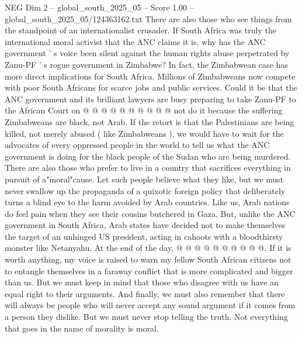 \begin{textsample}{NEG Dim 2 – global\_south\_2025\_05 – Score 1.00 – global\_south\_2025\_05/124363162.txt}
There are also those who see things from the standpoint of an internationalist crusader.
If South Africa was truly the international moral activist that the ANC claims it is, why has the ANC government ' s voice been silent against the human rights abuse perpetrated by Zanu-PF ' s rogue government in Zimbabwe?
In fact, the Zimbabwean case has more direct implications for South Africa.
Millions of Zimbabweans now compete with poor South Africans for scarce jobs and public services.
Could it be that the ANC government and its brilliant lawyers are busy preparing to take Zanu-PF to the African Court on @ @ @ @ @ @ @ @ @ @ not do it because the suffering Zimbabweans are black, not Arab.
If the retort is that the Palestinians are being killed, not merely abused ( like Zimbabweans ), we would have to wait for the advocates of every oppressed people in the world to tell us what the ANC government is doing for the black people of the Sudan who are being murdered.
There are also those who prefer to live in a country that sacrifices everything in pursuit of a"moral"cause.
Let such people believe what they like, but we must never swallow up the propaganda of a quixotic foreign policy that deliberately turns a blind eye to the harm avoided by Arab countries.
Like us, Arab nations do feel pain when they see their cousins butchered in Gaza.
But, unlike the ANC government in South Africa, Arab states have decided not to make themselves the target of an unhinged US president, acting in cahoots with a bloodthirsty monster like Netanyahu.
At the end of the day, @ @ @ @ @ @ @ @ @ @.
If it is worth anything, my voice is raised to warn my fellow South African citizens not to entangle themselves in a faraway conflict that is more complicated and bigger than us.
But we must keep in mind that those who disagree with us have an equal right to their arguments.
And finally, we must also remember that there will always be people who will never accept any sound argument if it comes from a person they dislike.
But we must never stop telling the truth.
Not everything that goes in the name of morality is moral.

\end{textsample}
